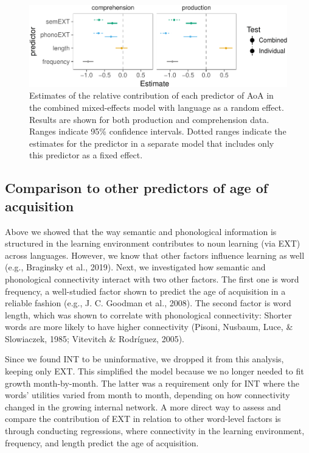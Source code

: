\documentclass[english,floatsintext,man]{apa6}
\theoremstyle{definition}
\theoremstyle{definition}
\theoremstyle{definition}
\theoremstyle{remark}
\begin{document}
\begin{figure}[!h]
\includegraphics[width=\textwidth]{ms_files/figure-latex/staticAll-1} \caption{Estimates of the relative contribution of each predictor of AoA in the combined mixed-effects model with language as a random effect. Results are shown for both production and comprehension data. Ranges indicate 95\% confidence intervals. Dotted ranges indicate the estimates for the predictor in a separate model that includes only this predictor as a fixed effect.}\label{fig:staticAll}
\end{figure}

\subsection{Comparison to other predictors of age of
acquisition}\label{comparison-to-other-predictors-of-age-of-acquisition}

Above we showed that the way semantic and phonological information is
structured in the learning environment contributes to noun learning (via
EXT) across languages. However, we know that other factors influence
learning as well (e.g., Braginsky et al., 2019). Next, we investigated
how semantic and phonological connectivity interact with two other
factors. The first one is word frequency, a well-studied factor shown to
predict the age of acquisition in a reliable fashion (e.g., J. C.
Goodman et al., 2008). The second factor is word length, which was shown
to correlate with phonological connectivity: Shorter words are more
likely to have higher connectivity (Pisoni, Nusbaum, Luce, \&
Slowiaczek, 1985; Vitevitch \& Rodríguez, 2005).

Since we found INT to be uninformative, we dropped it from this
analysis, keeping only EXT. This simplified the model because we no
longer needed to fit growth month-by-month. The latter was a requirement
only for INT where the words' utilities varied from month to month,
depending on how connectivity changed in the growing internal network. A
more direct way to assess and compare the contribution of EXT in
relation to other word-level factors is through conducting regressions,
where connectivity in the learning environment, frequency, and length
predict the age of acquisition.
\end{document}
